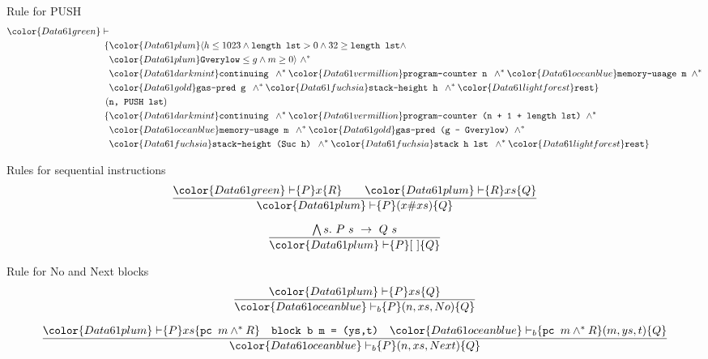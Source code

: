 \documentclass{beamer}
\begin{document}
\begin{frame}{Rule for PUSH}
	\begin{align*}
		{\color{Data61 green}\vdash}&\\
		\{&{\color{Data61 plum}\langle h \leq 1023 \wedge \texttt{length lst} > 0 \wedge 32 \geq \texttt{length lst} \wedge}\\
		&{\color{Data61 plum}\texttt{Gverylow} \leq g \wedge m \geq 0 \rangle}~ \wedge^* \\
		&{\color{Data61 dark mint}\texttt{continuing }} \wedge^*
		{\color{Data61 vermillion}\texttt{program-counter n }} \wedge^*
		{\color{Data61 ocean blue}\texttt{memory-usage m }} \wedge^* \\
		&{\color{Data61 gold}\texttt{gas-pred g }} \wedge^*
		{\color{Data61 fuchsia}\texttt{stack-height h }} \wedge^*
		{\color{Data61 light forest}\texttt{rest}}\}\\
		(&\texttt{n, PUSH lst}) \\
		\{&{\color{Data61 dark mint}\texttt{continuing }} \wedge^*
		{\color{Data61 vermillion}\texttt{program-counter (n + 1 + length lst) }} \wedge^*\\
		&{\color{Data61 ocean blue}\texttt{memory-usage m }} \wedge^*
		{\color{Data61 gold}\texttt{gas-pred (g - Gverylow) }} \wedge^*\\
		&{\color{Data61 fuchsia}\texttt{stack-height (Suc h) }} \wedge^*
		{\color{Data61 fuchsia}\texttt{stack h lst }} \wedge^*
		{\color{Data61 light forest}\texttt{rest}}\}
	\end{align*}
\end{frame}

\begin{frame}{Rules for sequential instructions}
	\[\frac{{\color{Data61 green}\vdash} \{P\} x \{R\}
		\qquad {\color{Data61 plum}\vdash} \{R\} xs \{Q\}}
	{{\color{Data61 plum}\vdash} \{P\} (x\#xs) \{Q\}}\]

	\[\frac{\bigwedge s.~P~s~\rightarrow~Q~s}
	{{\color{Data61 plum}\vdash} \{P\} [~] \{Q\}}\]
\end{frame}

\begin{frame}{Rule for No and Next blocks}
	\[\frac{{\color{Data61 plum}\vdash} \{P\} xs \{Q\}}
	{{\color{Data61 ocean blue}\vdash_b} \{P\} (n,xs,No) \{Q\}}\]

	\small
	\[\frac{{\color{Data61 plum}\vdash} \{P\} xs \{\texttt{pc } m \wedge^* R\}
		\quad \texttt{block b m = (ys,t)}
		\quad {\color{Data61 ocean blue}\vdash_b} \{\texttt{pc } m \wedge^* R\} (m,ys,t) \{Q\}}
	{{\color{Data61 ocean blue}\vdash_b} \{P\} (n,xs,Next) \{Q\}}\]
\end{frame}
\end{document}
